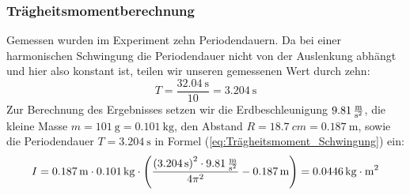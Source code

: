 \documentclass{article}
\begin{document}
			\subsubsection{Trägheitsmomentberechnung}
				Gemessen wurden im Experiment zehn Periodendauern. Da bei einer harmonischen Schwingung die Periodendauer nicht von der Auslenkung abhängt und hier also konstant ist, teilen wir unseren gemessenen Wert durch zehn:
				\begin{equation}
					T = \frac{ \SI{32,04}{\second} }{ 10 } = \SI{3,204}{\second}
				\end{equation}
				Zur Berechnung des Ergebnisses setzen wir die Erdbeschleunigung \(\SI{9,81}{\frac{\metre}{\second^2}}\), die kleine Masse \(m = \SI{101}{\gram} = \SI{0,101}{\kilogram} \),
				den Abstand \(R = \SI{18,7}{cm} = \SI{0,187}{\metre} \), sowie die Periodendauer \( T = \SI{3,204}{\second} \) in Formel (\ref{eq:Trägheitsmoment_Schwingung}) ein:
				\begin{equation}
					I = \SI{0,187}{\metre} \cdot \SI{0,101}{\kilogram} \cdot \left( \frac{ {( \SI{3,204}{\second} )}^2 \cdot \SI{9,81}{\frac{\metre}{\second^2}} }{ 4 \pi^2 } - \SI{0,187}{\metre} \right) = \SI{0,0446}{\kilogram \cdot \metre^2}
				\end{equation}
\end{document}
